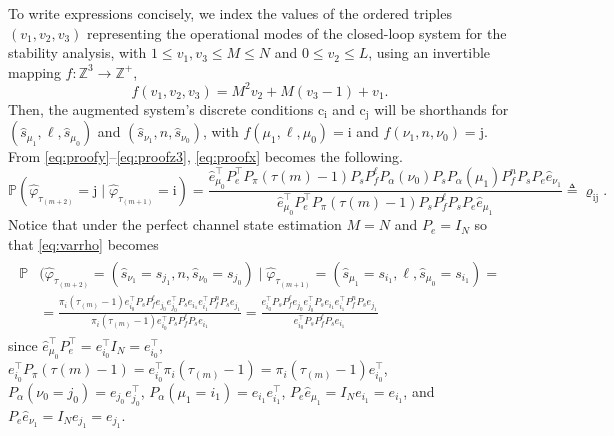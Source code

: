\documentclass[journal,twoside,web]{ieeecolor}
\begin{document}
\begin{figure*}[ht]
\raggedright
To write expressions concisely, we index the values of the ordered triples $\left(v_{1},v_{2},v_{3}\right)$ representing the operational modes of the closed-loop system for the stability analysis, with 
$1\leq v_{1},v_{3}\leq M\leq N$ and $0\leq v_{2}\leq L$, using an invertible mapping $f:\mathbb{Z}^{3}\to\mathbb{Z}^{+}$,
\begin{equation}\label{eq:mapping}
    f\left(v_{1},v_{2},v_{3}\right)=M^{2}v_{2}+M(v_{3}-1)+v_{1}.
\end{equation}
Then, the augmented system's discrete conditions $\mathrm{c}_{\mathrm{i}}$ and $\mathrm{c}_{\mathrm{j}}$ will be shorthands for $(\hat{s}_{\mu_1},\ell,\hat{s}_{\mu_0})$ and $(\hat{s}_{\nu_1},n,\hat{s}_{\nu_0})$, with $f({\mu_1},\ell,{\mu_0})=\mathrm{i}$ and $f({\nu_1},n,{\nu_0})=\mathrm{j}$. 
From \eqref{eq:proofy}--\eqref{eq:proofz3}, \eqref{eq:proofx} becomes the following.
\begin{equation}\label{eq:varrho}
\mathbb{P}(
\hat{\varphi}_{\tau_{(m+2)}}^{} = \mathrm{j} \mid \hat{\varphi}_{\tau_{(m+1)}}^{} = \mathrm{i}) = 
\frac{\hat{e}_{\mu_0}^{\top} P_{e}^{\top} P_{\pi}(\tau{(m)}-1) P_{s} P_{f}^{\ell} P_{\alpha}(\nu_0) P_{s} P_{\alpha}(\mu_1) P_{f}^{n} P_{s} P_{e}\hat{e}_{\nu_1}}{\hat{e}_{\mu_0}^{\top} P_{e}^{\top} P_{\pi}(\tau{(m)}-1) P_{s} P_{f}^{\ell} P_{s} P_{e}\hat{e}_{\mu_1}} 
\triangleq %
\varrho_{\mathrm{i}\mathrm{j}}.
\end{equation}
Notice that under the perfect channel state estimation $M=N$ and $P_e = I_{N}$ so that \eqref{eq:varrho} becomes
\begin{align}
\begin{aligned}
\mathbb{P}&(
\hat{\varphi}_{\tau_{(m+2)}}^{} = (\hat{s}_{\nu_{1}} = s_{j_1},n,\hat{s}_{\nu_{0}} = s_{j_0}) \mid 
\hat{\varphi}_{\tau_{(m+1)}}^{} = (\hat{s}_{\mu_{1}} = s_{i_1},\ell,\hat{s}_{\mu_{0}}= s_{i_1}) = \\
&=\frac{\pi_{i}(\tau_{(m)}-1)e_{i_0}^{\top} P_{s} P_{f}^{\ell} e_{j_0}e_{j_0}^{\top} P_{s} e_{i_1}e_{i_1}^{\top} P_{f}^{n}P_{s} e_{j_1}}{\pi_{i}(\tau_{(m)}-1)e_{i_0}^{\top} P_{s}P_{f}^{\ell}P_{s}e_{i_1}} = \frac{e_{i_0}^{\top} P_{s} P_{f}^{\ell} e_{j_0}e_{j_0}^{\top} P_{s} e_{i_1}e_{i_1}^{\top} P_{f}^{n}P_{s} e_{j_1}}{e_{i_0}^{\top} P_{s}P_{f}^{\ell}P_{s}e_{i_1}}
\end{aligned}
\end{align}
since $\hat{e}_{\mu_0}^{\top} P_{e}^{\top} = e_{i_0}^{\top} I_{N} = e_{i_0}^{\top}$, 
$e_{i_0}^{\top} P_{\pi}(\tau{(m)}-1)=e_{i_0}^{\top}\pi_{i}(\tau_{(m)}-1)=\pi_{i}(\tau_{(m)}-1)e_{i_0}^{\top}$, $P_{\alpha}(\nu_0=j_0)=e_{j_0}e_{j_0}^{\top}$, $P_{\alpha}(\mu_1=i_1)=e_{i_1}e_{i_1}^{\top}$, $P_{e}\hat{e}_{\mu_1} = I_{N} e_{i_1}  = e_{i_1}$, and
$P_{e}\hat{e}_{\nu_1} = I_{N} e_{j_1}  = e_{j_1}$.
\end{figure*}




% 
% 
\end{document}
